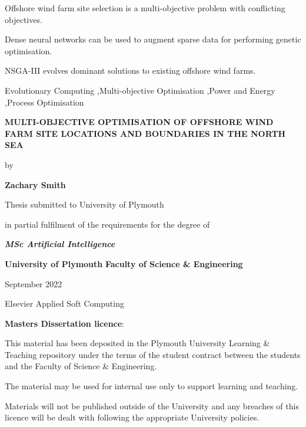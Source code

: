 \documentclass[preprint,12pt]{elsarticle}
\begin{document}
\begin{frontmatter}
\begin{graphicalabstract}
\end{graphicalabstract}

\begin{highlights}
\item Offshore wind farm site selection is a multi-objective problem with conflicting objectives.
\item Dense neural networks can be used to augment sparse data for performing genetic optimisation.
\item NSGA-III evolves dominant solutions to existing offshore wind farms.
\end{highlights}

\begin{keyword}
Evolutionary Computing \sep Multi-objective Optimisation \sep Power and Energy \sep Process Optimisation
\end{keyword}

\clearpage

\begin{Center}
\textbf{MULTI-OBJECTIVE OPTIMISATION OF OFFSHORE WIND FARM SITE LOCATIONS AND BOUNDARIES IN THE NORTH SEA}

by

\textbf{Zachary Smith}


Thesis submitted to University of Plymouth

in partial fulfilment of the requirements for the degree of


\textbf{\textit{MSc Artificial Intelligence}}


\textbf{University of Plymouth }
\textbf{Faculty of Science \& Engineering}


September 2022
\end{Center}

\vspace*{\fill} %
{\raggedleft Elsevier Applied Soft Computing\par}
\clearpage

\textbf{Masters Dissertation licence}:

This material has been deposited in the Plymouth University Learning \& Teaching repository under the terms of the student contract between the students and the Faculty of Science \& Engineering.

The material may be used for internal use only to support learning and teaching.

Materials will not be published outside of the University and any breaches of this licence will be dealt with following the appropriate University policies.


\end{frontmatter}
\end{document}
